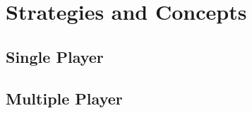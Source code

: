 \section{Strategies and Concepts}
\label{sec:strategies}

\subsection{Single Player}



\subsection{Multiple Player}

